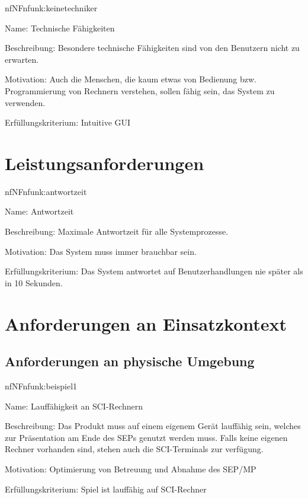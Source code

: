 \begin{description}[leftmargin=5em, style=sameline]	
	\begin{lhp}{nf}{NF}{nfunk:keinetechniker}
		\item [Name:] Technische Fähigkeiten
		\item [Beschreibung:] Besondere technische Fähigkeiten sind von den Benutzern nicht zu erwarten.
		\item [Motivation:] Auch die Menschen, die kaum etwas von Bedienung bzw. Programmierung von Rechnern verstehen, sollen fähig sein, das System zu verwenden.
		\item [Erfüllungskriterium:] Intuitive GUI
	\end{lhp}
\end{description}

\section{Leistungsanforderungen}

\begin{description}[leftmargin=5em, style=sameline]	
	\begin{lhp}{nf}{NF}{nfunk:antwortzeit}
		\item [Name:] Antwortzeit
		\item [Beschreibung:] Maximale Antwortzeit für alle Systemprozesse.
		\item [Motivation:] Das System muss immer brauchbar sein.
		\item [Erfüllungskriterium:] Das System antwortet auf Benutzerhandlungen nie später als in 10 Sekunden.
	\end{lhp}
\end{description}

\section{Anforderungen an Einsatzkontext}

\subsection{Anforderungen an physische Umgebung}

\begin{description}[leftmargin=5em, style=sameline]	
	\begin{lhp}{nf}{NF}{nfunk:beispiel1}
		\item [Name:] Lauffähigkeit an SCI-Rechnern
		\item [Beschreibung:] Das Produkt muss auf einem eigenem Gerät lauffähig sein, welches zur Präsentation am Ende des SEPs genutzt werden muss. Falls keine eigenen Rechner vorhanden sind, stehen auch die SCI-Terminals zur verfügung.
		\item [Motivation:] Optimierung von Betreuung und Abnahme des SEP/MP
		\item [Erfüllungskriterium:] Spiel ist lauffähig auf SCI-Rechner
	\end{lhp}
\end{description}



